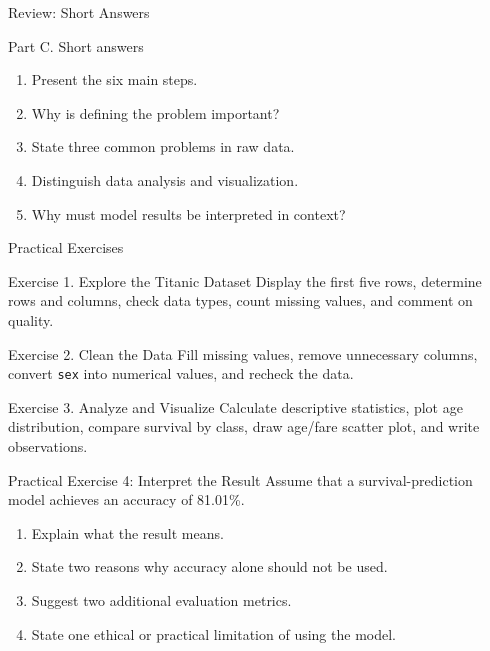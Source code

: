 \documentclass[aspectratio=169,11pt]{beamer}
\begin{document}
\begin{frame}{Review: Short Answers}
\begin{block}{Part C. Short answers}
\begin{enumerate}
  \item Present the six main steps.
  \item Why is defining the problem important?
  \item State three common problems in raw data.
  \item Distinguish data analysis and visualization.
  \item Why must model results be interpreted in context?
\end{enumerate}
\end{block}
\end{frame}

\begin{frame}{Practical Exercises}
\begin{block}{Exercise 1. Explore the Titanic Dataset}
Display the first five rows, determine rows and columns, check data types, count missing values, and comment on quality.
\end{block}
\begin{block}{Exercise 2. Clean the Data}
Fill missing values, remove unnecessary columns, convert \texttt{sex} into numerical values, and recheck the data.
\end{block}
\begin{block}{Exercise 3. Analyze and Visualize}
Calculate descriptive statistics, plot age distribution, compare survival by class, draw age/fare scatter plot, and write observations.
\end{block}
\end{frame}

\begin{frame}{Practical Exercise 4: Interpret the Result}
Assume that a survival-prediction model achieves an accuracy of 81.01\%.
\begin{enumerate}
  \item Explain what the result means.
  \item State two reasons why accuracy alone should not be used.
  \item Suggest two additional evaluation metrics.
  \item State one ethical or practical limitation of using the model.
\end{enumerate}
\end{frame}

\appendix
\end{document}
